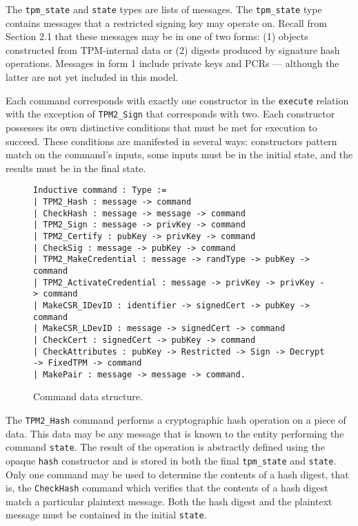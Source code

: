 \documentclass[runningheads]{llncs}
\begin{document}
The \verb|tpm_state| and \verb|state| types are lists of messages. The
\verb|tpm_state| type contains messages that a restricted signing key
may operate on. Recall from Section 2.1 that these messages may be in
one of two forms: (1) objects constructed from TPM-internal data or
(2) digests produced by signature hash operations. Messages in form 1
include private keys and PCRs --- although the latter are not yet
included in this model.

Each command corresponds with exactly one constructor in the
\verb|execute| relation with the exception of \verb|TPM2_Sign| that
corresponds with two. Each constructor possesses its own distinctive
conditions that must be met for execution to succeed. These
conditions are manifested in several ways: constructors pattern match
on the command's inputs, some inputs must be in the initial state, and
the results must be in the final state. 

\begin{figure}[hbtp]
  \begin{footnotesize}
\begin{lstlisting}[language=Coq]
Inductive command : Type :=
| TPM2_Hash : message -> command
| CheckHash : message -> message -> command
| TPM2_Sign : message -> privKey -> command
| TPM2_Certify : pubKey -> privKey -> command
| CheckSig : message -> pubKey -> command
| TPM2_MakeCredential : message -> randType -> pubKey -> command
| TPM2_ActivateCredential : message -> privKey -> privKey -> command
| MakeCSR_IDevID : identifier -> signedCert -> pubKey -> command
| MakeCSR_LDevID : message -> signedCert -> command
| CheckCert : signedCert -> pubKey -> command
| CheckAttributes : pubKey -> Restricted -> Sign -> Decrypt -> FixedTPM -> command
| MakePair : message -> message -> command.
\end{lstlisting}
\end{footnotesize}
\caption{Command data structure.}
\label{fig:command-model}
\end{figure}

The \verb|TPM2_Hash| command performs a cryptographic hash operation
on a piece of data. This data may be any message that is known to the
entity performing the command \verb|state|. The result of the
operation is abstractly defined using the opaque \verb|hash|
constructor and is stored in both the final \verb|tpm_state| and
\verb|state|. Only one command may be used to determine the contents
of a hash digest, that is, the \verb|CheckHash| command which verifies
that the contents of a hash digest match a particular plaintext
message. Both the hash digest and the plaintext message must be
contained in the initial \verb|state|.
\end{document}
